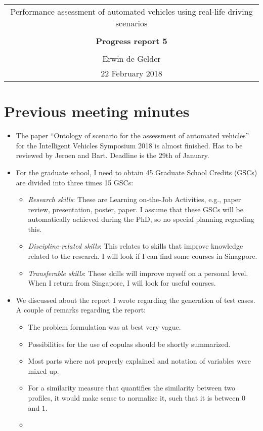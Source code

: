 \documentclass[10pt,final,a4paper,oneside,onecolumn]{article}
\newcommand{\progressreportnumber}{5}
\renewcommand{\author}{Erwin de Gelder}
\renewcommand{\date}{22 February 2018}
\renewcommand{\title}{Performance assessment of automated vehicles using real-life driving scenarios}
\begin{document}
	
\begin{center}
	\begin{tabular}{c}
		\title \\ \\
		\textbf{\huge Progress report \progressreportnumber} \\ \\
		\author \\ 
		\date
	\end{tabular}
\end{center}

\section{Previous meeting minutes}

\begin{itemize}
	\item The paper ``Ontology of scenario for the assessment of automated vehicles'' for the Intelligent Vehicles Symposium 2018 is almost finished. Has to be reviewed by Jeroen and Bart. Deadline is the 29th of January.
	\item For the graduate school, I need to obtain 45 Graduate School Credits (GSCs) are divided into three times 15 GSCs:
	\begin{itemize}
		\item \emph{Research skills}: These are Learning on-the-Job Activities, e.g., paper review, presentation, poster, paper. I assume that these GSCs will be automatically achieved during the PhD, so no special planning regarding this.
		\item \emph{Discipline-related skills}: This relates to skills that improve knowledge related to the research. I will look if I can find some courses in Sinagpore.
		\item \emph{Transferable skills}: These skills will improve myself on a personal level. When I return from Singapore, I will look for useful courses.
	\end{itemize}
	\item We discussed about the report I wrote regarding the generation of test cases. A couple of remarks regarding the report:
	\begin{itemize}
		\item The problem formulation was at best very vague.
		\item Possibilities for the use of copulas should be shortly summarized.
		\item Most parts where not properly explained and notation of variables were mixed up.
		\item For a similarity measure that quantifies the similarity between two profiles, it would make sense to normalize it, such that it is between $0$ and $1$. 
		\item 
	\end{itemize}
\end{itemize}
\end{document}
